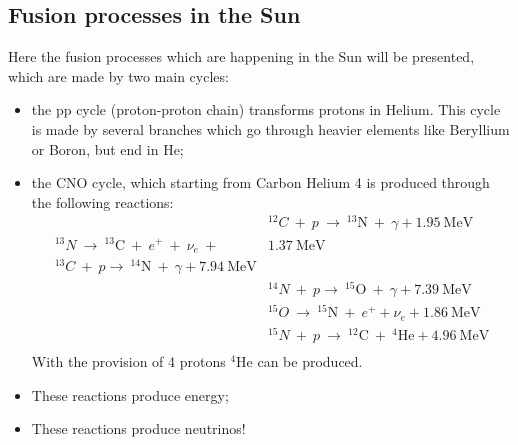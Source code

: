 \subsection{Fusion processes in the Sun}
Here the fusion processes which are happening in the Sun will be presented, which are made by two main cycles:
\begin{itemize}
    \item the pp cycle (proton-proton chain) transforms protons in Helium. This cycle is made by several branches which go through heavier elements like Beryllium or Boron, but end in He;
    \item the CNO cycle, which starting from Carbon Helium 4 is produced through the following reactions:
    \begin{equation*}
    \begin{split}
        &^{12}C~+~p ~ \rightarrow ~ ^{13}\mbox{N}~+~\gamma + 1.95~\mbox{MeV}\\
        ^{13}N ~ \rightarrow ~ ^{13}\mbox{C}~+~ e^+ ~+~ \nu_e ~+~ &1.37~\mbox{MeV}\\
        ^{13}C ~+~p \rightarrow ~ ^{14}\mbox{N}~+~\gamma + 7.94~\mbox{MeV}\\
        &^{14}N ~+~p \rightarrow ~ ^{15}\mbox{O}~+~\gamma + 7.39~\mbox{MeV}\\
        &^{15}O ~\rightarrow ~ ^{15}\mbox{N}~+~ e^+ + \nu_e + 1.86~\mbox{MeV}\\
        &^{15}N ~+~ p ~\rightarrow ~ ^{12}\mbox{C}~+~ ^{4}\mbox{He} + 4.96~\mbox{MeV}\\
    \end{split}
    \end{equation*}
    With the provision of 4 protons $^{4}\mbox{He}$ can be produced.
\end{itemize}
\begin{itemize}
        \item These reactions produce energy;
        \item These reactions produce neutrinos!
    \end{itemize}
